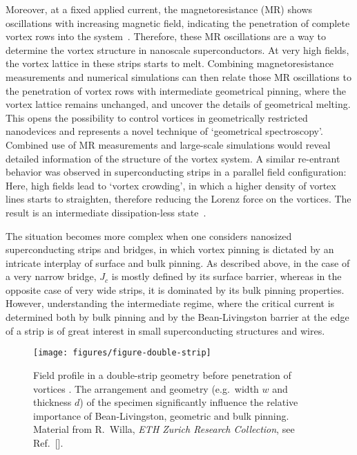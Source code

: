 \documentclass[%
 aip,
 amsmath,amssymb,
 reprint,%
floatfix]{revtex4-1}
\newcommand{\Jc}{J_{c}}
\begin{document}
Moreover, at a fixed applied current, the magnetoresistance (MR) shows oscillations with increasing magnetic field, indicating the penetration of complete vortex rows into the system~\cite{Papari2016}. Therefore, these MR oscillations are a way to determine the vortex structure in nanoscale superconductors. At very high fields, the vortex lattice in these strips starts to melt. Combining magnetoresistance measurements and numerical simulations can then relate those MR oscillations to the penetration of vortex rows with intermediate geometrical pinning, where the vortex lattice remains unchanged, and uncover the details of geometrical melting. This opens the possibility to control vortices in geometrically restricted nanodevices and represents a novel technique of `geometrical spectroscopy'. Combined use of MR measurements and large-scale simulations would reveal detailed information of the structure of the vortex system. A similar re-entrant behavior was observed in superconducting strips in a parallel field configuration: Here, high fields lead to `vortex crowding', in which a higher density of vortex lines starts to straighten, therefore reducing the Lorenz force on the vortices. The result is an intermediate dissipation-less state~\cite{parallel2017}.

The situation becomes more complex when one considers nanosized superconducting strips and bridges, in which vortex pinning is dictated by an intricate interplay of surface and bulk pinning. As described above, in the case of a very narrow bridge, $\Jc$ is mostly defined by its surface barrier, whereas in the opposite case of very wide strips, it is dominated by its bulk pinning properties. However, understanding the intermediate regime, where the critical current is determined both by bulk pinning and by the Bean-Livingston barrier at the edge of a strip is of great interest in small superconducting structures and wires. 

\begin{figure}
\centering
\texttt{[image: figures/figure-double-strip]}
\caption{\label{fig:doublestrip} Field profile in a double-strip geometry before penetration of vortices \cite{Willa2014}. The arrangement and geometry (e.g.\ width $w$ and thickness $d$) of the specimen significantly influence the relative importance of Bean-Livingston, geometric and bulk pinning. Material from R.\ Willa, \emph{ETH Zurich Research Collection}, see Ref.~[].
}
\end{figure}
\end{document}
